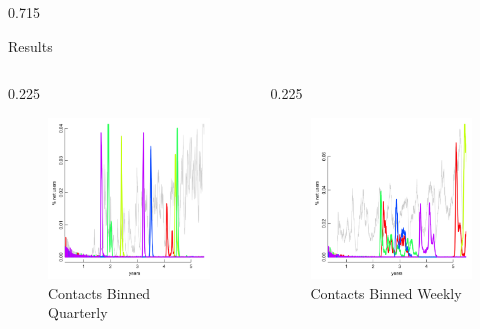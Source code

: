 \documentclass[final]{beamer} %
\newcommand{\spaceProp}{0.02}
\newcommand{\spacer}{\begin{column}{\spaceProp\paperwidth}\end{column}}
\newenvironment{oneCol}{\begin{column}[t]{0.225\paperwidth}}{\end{column}}
\newenvironment{threeCol}{\begin{column}[t]{0.715\paperwidth}}{\end{column}}
\begin{document}
\begin{frame}{}
\begin{columns}[t]
\begin{threeCol}
\begin{block}{Results}
\begin{columns}
\begin{oneCol}
\begin{figure}
        \includegraphics[width=1.0\linewidth]{out90.png}
        \caption{Contacts Binned Quarterly}
      \end{figure}  
    \end{oneCol}
    \begin{oneCol}
      \setcounter{figure}{1}
      \begin{figure}
        \caption{Contacts Binned Weekly}
        \includegraphics[width=1.0\linewidth]{out7.png}

\end{figure}
\end{oneCol}
\end{columns}
\end{block}
\end{threeCol}
\end{columns}
\end{frame}
\end{document}
